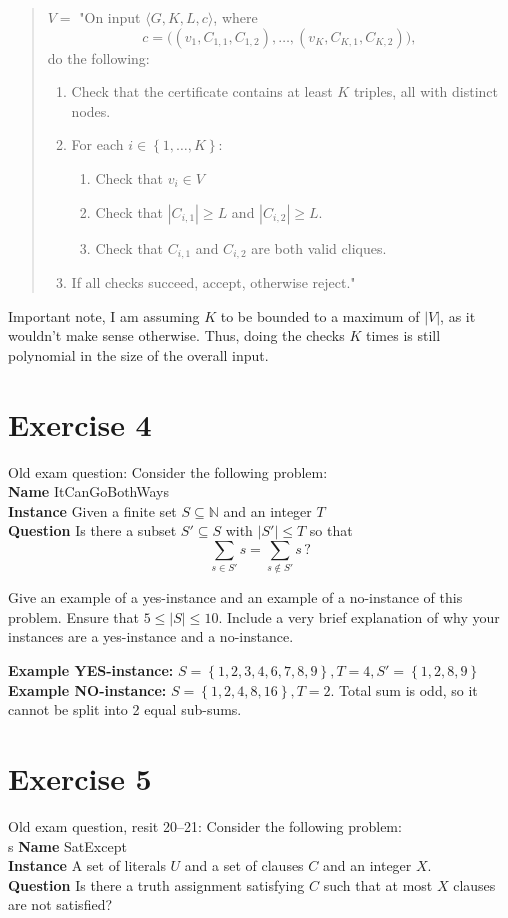 \documentclass[a4paper,11pt]{article}
\newcommand{\set}[1]{\left\{ #1 \right\}}
\begin{document}
	\begin{quote}
		$V=$ "On input $\langle G,K,L, c\rangle$, where
		\[
		c=\big((v_1,C_{1,1},C_{1,2}),\dots,(v_K,C_{K,1},C_{K,2})\big),
		\]
		do the following:
		\begin{enumerate}
			\item Check that the certificate contains at least $K$ triples, all with distinct nodes.
			\item For each $i\in\set{1,\dots,K}$:
			\begin{enumerate}
				\item Check that $v_i\in V$
				\item Check that $|C_{i,1}|\geq L$ and $|C_{i,2}|\geq L$.
				\item Check that $C_{i,1}$ and $C_{i,2}$ are both valid cliques.
			\end{enumerate}
			\item If all checks succeed, accept, otherwise reject."
		\end{enumerate}
	\end{quote}
	Important note, I am assuming $K$ to be bounded to a maximum of $|V|$, as it wouldn't make sense otherwise. Thus, doing the checks $K$ times is still polynomial in the size of the overall input.

	\section{Exercise 4}
	Old exam question: Consider the following problem:\\
	\textbf{Name} ItCanGoBothWays\\
	\textbf{Instance} Given a finite set $S \subseteq \mathbb{N}$ and an integer $T$\\
	\textbf{Question} Is there a subset $S' \subseteq S$ with $|S'| \leq T$ so that
	\[
	\sum_{s \in S'} s = \sum_{s \notin S'} s \, ?
	\]

	Give an example of a yes-instance and an example of a no-instance of this problem. Ensure that $5 \leq |S| \leq 10$. Include a very brief explanation of why your instances are a yes-instance and a no-instance.

	\textbf{Example YES-instance: }$S=\set{1,2,3,4,6,7,8,9},T=4,S'=\set{1,2,8,9}$\\

	\textbf{Example NO-instance: }$S=\set{1,2,4,8,16},T=2$. Total sum is odd, so it cannot be split into 2 equal sub-sums.


	\section{Exercise 5}
	Old exam question, resit 20--21: Consider the following problem:\\s
	\textbf{Name} SatExcept\\
	\textbf{Instance} A set of literals $U$ and a set of clauses $C$ and an integer $X$.\\
	\textbf{Question} Is there a truth assignment satisfying $C$ such that at most $X$ clauses are not satisfied?
\end{document}
